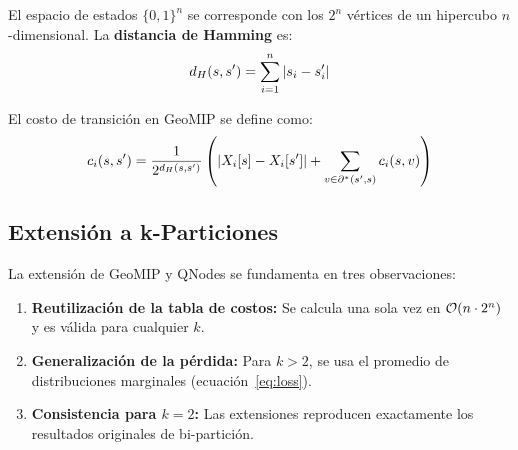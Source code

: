 El espacio de estados $\{0,1\}^n$ se corresponde con los $2^n$ vértices de un hipercubo $n$-dimensional. La \textbf{distancia de Hamming} es:
\begin{equation}
    d_H(s, s') = \sum_{i=1}^{n} |s_i - s'_i|
\end{equation}

El costo de transición en GeoMIP se define como:
\begin{equation}
    c_i(s, s') = \frac{1}{2^{d_H(s,s')}} \left(\left|X_i[s] - X_i[s']\right| + \sum_{v \in \partial^*(s',s)} c_i(s, v)\right)
    \label{eq:cost}
\end{equation}

\subsection{Extensión a k-Particiones}

La extensión de GeoMIP y QNodes se fundamenta en tres observaciones:

\begin{enumerate}[label=\textbf{\arabic*.}]
    \item \textbf{Reutilización de la tabla de costos:} Se calcula una sola vez en $\mathcal{O}(n \cdot 2^n)$ y es válida para cualquier $k$.
    \item \textbf{Generalización de la pérdida:} Para $k > 2$, se usa el promedio de distribuciones marginales (ecuación~\eqref{eq:loss}).
    \item \textbf{Consistencia para $k=2$:} Las extensiones reproducen exactamente los resultados originales de bi-partición.
\end{enumerate}
